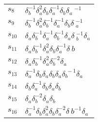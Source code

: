 \documentclass{article}
\begin{document}
\begin{center}
\begin{tabular}{ll}
$s_{8}$ & $\delta_b^{-1}\delta_a^{2}\delta_b^{}\delta_a^{-1}\delta_b^{}\delta_a\
^{-1}$ \\
$s_{9}$ & $\delta_b^{-1}\delta_a^{2}\delta_b^{-1}\delta_a^{-1}\delta_b^{}\delta\
_a^{-1}$ \\
$s_{10}$ & $\delta_a^{}\delta_b^{-1}\delta_a^{-1}\delta_b^{-1}\delta_a^{}\delta\
_b^{-1}\delta_a^{}$ \\
$s_{11}$ & $\delta_a^{}\delta_b^{-1}\delta_a^{2}\delta_b^{}\delta_a^{-1}\delta_\
b^{}$ \\
$s_{12}$ & $\delta_a^{}\delta_b^{-1}\delta_a^{2}\delta_b^{-2}\delta_a^{}$ \\
$s_{13}$ & $\delta_a^{-1}\delta_b^{}\delta_a^{}\delta_b^{}\delta_a^{}\delta_b^{\
-1}\delta_a^{}$ \\
$s_{14}$ & $\delta_b^{}\delta_a^{-1}\delta_b^{}\delta_a^{}\delta_b^{}$ \\
$s_{15}$ & $\delta_a^{}\delta_b^{-2}\delta_a^{}\delta_b^{}$ \\
$s_{16}$ & $\delta_a^{-1}\delta_b^{}\delta_a^{2}\delta_b^{}\delta_a^{-2}\delta_\
b^{-1}\delta_a^{}$ \\
\bottomrule
\end{tabular}
\end{center}

\thispagestyle{empty}
\end{document}
